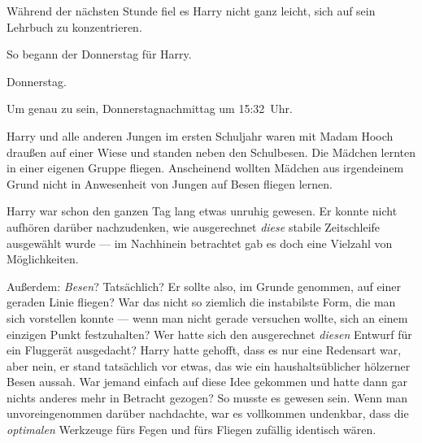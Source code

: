 Während der nächsten Stunde fiel es Harry nicht ganz leicht, sich auf sein Lehrbuch zu konzentrieren.

So begann der Donnerstag für Harry.

\later

Donnerstag.

Um genau zu sein, Donnerstagnachmittag um 15:32~Uhr.

Harry und alle anderen Jungen im ersten Schuljahr waren mit Madam Hooch draußen auf einer Wiese und standen neben den Schulbesen. Die Mädchen lernten in einer eigenen Gruppe fliegen. Anscheinend wollten Mädchen aus irgendeinem Grund nicht in Anwesenheit von Jungen auf Besen fliegen lernen.

Harry war schon den ganzen Tag lang etwas unruhig gewesen. Er konnte nicht aufhören darüber nachzudenken, wie ausgerechnet \emph{diese} stabile Zeitschleife ausgewählt wurde — im Nachhinein betrachtet gab es doch eine Vielzahl von Möglichkeiten.

Außerdem: \emph{Besen}? Tatsächlich? Er sollte also, im Grunde genommen, auf einer geraden Linie fliegen? War das nicht so ziemlich die instabilste Form, die man sich vorstellen konnte — wenn man nicht gerade versuchen wollte, sich an einem einzigen Punkt festzuhalten? Wer hatte sich den ausgerechnet \emph{diesen} Entwurf für ein Fluggerät ausgedacht? Harry hatte gehofft, dass es nur eine Redensart war, aber nein, er stand tatsächlich vor etwas, das wie ein haushaltsüblicher hölzerner Besen aussah. War jemand einfach auf diese Idee gekommen und hatte dann gar nichts anderes mehr in Betracht gezogen? So musste es gewesen sein. Wenn man unvoreingenommen darüber nachdachte, war es vollkommen undenkbar, dass die \emph{optimalen} Werkzeuge fürs Fegen und fürs Fliegen zufällig identisch wären.

